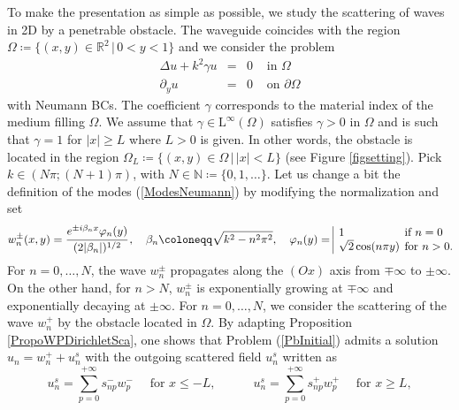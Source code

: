 \documentclass[11pt,a4paper]{report}
\newcommand{\Om}{\Omega}
\newcommand{\mrm}[1]{\mathrm{#1}}
\newcommand{\N}{\mathbb{N}}
\newcommand{\R}{\mathbb{R}}
\newcommand{\mL}{\mrm{L}}
\begin{document}
\noindent  To make the presentation as simple as possible, we study the scattering of waves in 2D by a penetrable obstacle. The waveguide coincides with the region $\Om\coloneqq\{(x,y)\in\R^2\,|\,0<y<1\}$ and we consider the problem
\begin{equation}\label{PbInitial}
\begin{array}{|rcll}
\Delta u + k^2\gamma u & = & 0 & \mbox{ in }\Om\\[3pt]
 \partial_y u & = & 0  & \mbox{ on }\partial\Om
\end{array}
\end{equation}
with Neumann BCs. The coefficient $\gamma$ corresponds to the material index of the medium filling $\Om$. We assume that $\gamma\in\mL^\infty(\Om)$ satisfies $\gamma>0$ in $\Om$ and is such that $\gamma=1$ for $|x|\ge L$ where $L>0$ is given. In other words, the obstacle is located in the region $\Om_L\coloneqq\{(x,y)\in\Om\,|\,|x|<L\}$ (see Figure \ref{figsetting}). Pick $k\in(N\pi;(N+1)\pi)$, with $N\in\N\coloneqq\{0,1,\dots\}$. 
Let us change a bit the definition of the modes (\ref{ModesNeumann}) by modifying the normalization and set
\begin{equation}\label{defModes}
w_n^{\pm}(x,y)=\cfrac{e^{\pm i\beta_n x}\varphi_n(y)}{(2|\beta_n|)^{1/2}}\,,\quad\beta_n\coloneqq\sqrt{k^2-n^2\pi^2},\quad \varphi_n(y)=\begin{array}{|ll}
1 & \hspace{-0.2cm}\mbox{if }n=0\\
\sqrt{2}\cos(n\pi y) & \hspace{-0.2cm}\mbox{for }n>0.
\end{array}\hspace{-0.2cm}
\end{equation}
For $n=0,\dots,N$, the wave $w_n^{\pm}$ propagates along the $(Ox)$ axis from $\mp\infty$ to $\pm\infty$. On the other hand, for $n> N$, $w_n^{\pm}$ is exponentially  growing at $\mp\infty$ and exponentially decaying at $\pm\infty$. For $n=0,\dots,N$, we consider the scattering of the wave $w_n^{+}$ by the obstacle located in $\Om$. By adapting Proposition \ref{PropoWPDirichletSca}, one shows that Problem (\ref{PbInitial}) admits a solution $u_n=w_n^{+}+u^s_n$ with the outgoing scattered field $u^s_n$ written as
\begin{equation}\label{RadiationCondition}
u^s_n=\sum_{p=0}^{+\infty} s^{-}_{np}w_p^{-}\quad\mbox{ for }x\le-L, \qquad\quad u^s_n=\sum_{p=0}^{+\infty} s^{+}_{np}w_p^{+}\quad\mbox{ for } x \ge L,
\end{equation}
\end{document}
